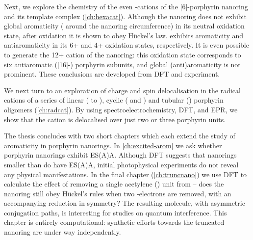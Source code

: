 		Next, we explore the chemistry of the even \pii{}-cations of the [6]-porphyrin nanoring  and its template complex  (\autoref{ch:hexacat}). Although the nanoring does not exhibit global aromaticity ( around the nanoring circumference) in its neutral oxidation state, after oxidation it is shown to obey H\"uckel's law.  exhibits aromaticity and antiaromaticity in its 6+ and 4+ oxidation states, respectively. It is even possible to generate the 12+ cation of the nanoring: this oxidation state corresponds to six antiaromatic ([16]-\pii{}) porphyrin subunits, and global (anti)aromaticity is not prominent. These conclusions are developed from DFT and experiment.

		We next turn to an exploration of charge and spin delocalisation in the radical cations of a series of linear ( to ), cyclic ( and ) and tubular (\tubewt{}) porphyrin oligomers (\autoref{ch:radcat}). By using spectroelectrochemistry, DFT, and EPR, we show that the cation is delocalised over just two or three porphyrin units.

		The thesis concludes with two short chapters which each extend the study of aromaticity in porphyrin nanorings. In \autoref{ch:excited-arom} we ask whether porphyrin nanorings exhibit ES(A)A\@. Although DFT suggests that nanorings smaller than  do have ES(A)A, initial photophysical experiments do not reveal any physical manifestations. In the final chapter (\autoref{ch:truncnano}) we use DFT to calculate the effect of removing a single acetylene () unit from  -- does the nanoring still obey H\"uckel's rules when two \pii{}-electrons are removed, with an accompanying reduction in symmetry? The resulting molecule, with asymmetric conjugation paths, is interesting for studies on quantum interference. This chapter is entirely computational: synthetic efforts towards the truncated nanoring are under way independently. 




